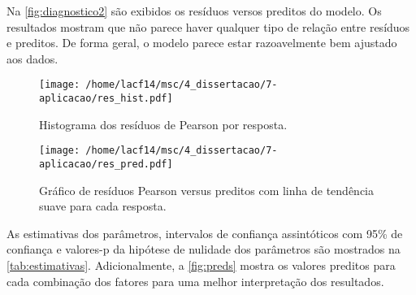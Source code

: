 Na \autoref{fig:diagnostico2} são exibidos os resíduos versos preditos do modelo. Os resultados mostram que não parece haver qualquer tipo de relação entre resíduos e preditos. De forma geral, o modelo parece estar razoavelmente bem ajustado aos dados.

\begin{figure}[H]
\centering
\texttt{[image: /home/lacf14/msc/4\_dissertacao/7-aplicacao/res\_hist.pdf]}
\caption{Histograma dos resíduos de Pearson por resposta.}
\label{fig:diagnostico1}
\end{figure}

\begin{figure}[H]
\centering
\texttt{[image: /home/lacf14/msc/4\_dissertacao/7-aplicacao/res\_pred.pdf]}
\caption{Gráfico de resíduos Pearson versus preditos com linha de tendência suave para cada resposta.}
\label{fig:diagnostico2}
\end{figure}

As estimativas dos parâmetros, intervalos de confiança assintóticos com 95\% de confiança e valores-p da hipótese de nulidade dos parâmetros são mostrados na \autoref{tab:estimativas}. Adicionalmente, a \autoref{fig:preds} mostra os valores preditos para cada combinação dos fatores para uma melhor interpretação dos resultados.

